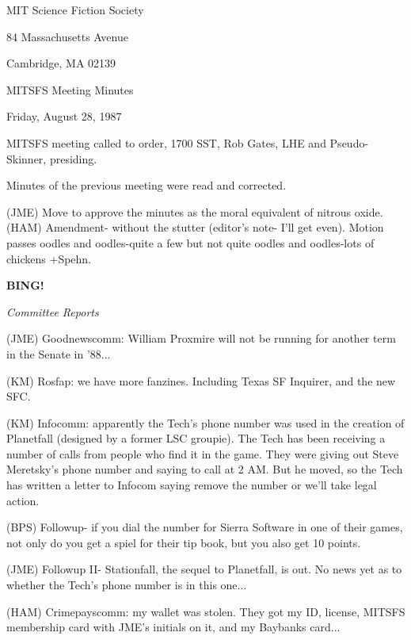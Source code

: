 \documentclass[12pt]{article}
\newcommand{\bing}{{\bf BING!} }
\newcommand{\goto}[1]{\bing \vskip 12pt \centerline{{\em{#1}}}}
\begin{document}
\begin{center}

MIT Science Fiction Society 

84 Massachusetts Avenue

Cambridge, MA 02139

\vspace{12pt}

MITSFS Meeting Minutes 

Friday, August 28, 1987

\end{center}
 
\vspace{18pt}

\setlength{\parskip}{6pt}

\noindent
MITSFS meeting called to order, 1700 SST,
Rob Gates, LHE and Pseudo-Skinner, presiding.

Minutes of the previous meeting were read and corrected.

(JME) Move to approve the minutes as the moral equivalent of nitrous oxide. (HAM) Amendment- without the stutter (editor's note- I'll get even). Motion passes oodles and oodles-quite a few but not quite oodles and oodles-lots of chickens +Spehn.

\goto{Committee Reports}

(JME) Goodnewscomm: William Proxmire will not be running for another term in the Senate in '88...

(KM) Rosfap: we have more fanzines. Including Texas SF Inquirer, and the new SFC.

(KM) Infocomm: apparently the Tech's phone number was used in the creation of Planetfall (designed by a former LSC groupie). The Tech has been receiving a number of calls from people who find it in the game. They were giving out Steve Meretsky's phone number and saying to call at 2 AM. But he moved, so the Tech has written a letter to Infocom saying remove the number or we'll take legal action.

(BPS) Followup- if you dial the number for Sierra Software in one of their games, not only do you get a spiel for their tip book, but you also get 10 points.

(JME) Followup II- Stationfall, the sequel to Planetfall, is out. No news yet as to whether the Tech's phone number is in this one...

(HAM) Crimepayscomm: my wallet was stolen. They got my ID, license, MITSFS membership card with JME's initials on it, and my Baybanks card...
\end{document}
